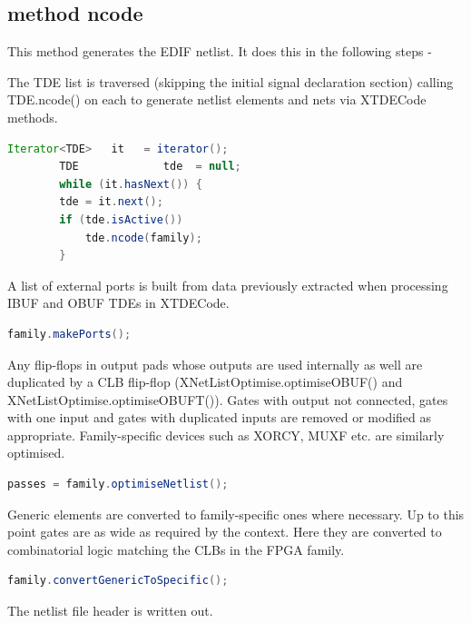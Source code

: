 \subsection{method ncode}

    This method generates the EDIF netlist. It does this in the following
    steps -
    
    The TDE list is traversed (skipping the initial signal declaration
    section) calling TDE.ncode() on each to generate netlist elements and nets
    via XTDECode methods.
    
    \begin{lstlisting}[gobble=8, language=java]
        Iterator<TDE>   it   = iterator();
        TDE             tde  = null;
        while (it.hasNext()) {
        tde = it.next();
        if (tde.isActive())
            tde.ncode(family);
        }
    \end{lstlisting}
    
    A list of external ports is built from data previously extracted
    when processing IBUF and OBUF TDEs in XTDECode.

    \begin{lstlisting}[gobble=8, language=java]
        family.makePorts();
    \end{lstlisting}
    
    Any flip-flops in output pads whose outputs are used internally as well are
    duplicated by a CLB flip-flop (XNetListOptimise.optimiseOBUF() and
    XNetListOptimise.optimiseOBUFT()). Gates with output not connected, gates
    with one input and gates with duplicated inputs are removed or modified as
    appropriate. Family-specific devices such as XORCY, MUXF etc. are similarly
    optimised.
     
    \begin{lstlisting}[gobble=8, language=java]
        passes = family.optimiseNetlist();
    \end{lstlisting}

    Generic elements are converted to family-specific ones where necessary.
    Up to this point gates are as wide as required by the context. Here they are
    converted to combinatorial logic matching the CLBs in the FPGA family.
        
    \begin{lstlisting}[gobble=8, language=java]
        family.convertGenericToSpecific();
    \end{lstlisting}

    The netlist file header is written out.
    
